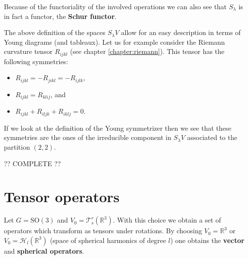     Because of the functoriality of the involved operations we can also see that $S_\lambda$ is in fact a functor, the \textbf{Schur functor}.

    \begin{example}
        The above definition of the spaces $S_\lambda V$ allow for an easy description in terms of Young diagrams (and tableaux). Let us for example consider the Riemann curvature tensor $R_{ijkl}$ (see chapter \ref{chapter:riemann}). This tensor has the following symmetries:
        \begin{itemize}
            \item $R_{ijkl} = -R_{jikl} = -R_{ijlk}$,
            \item $R_{ijkl} = R_{klij}$, and
            \item $R_{ijkl} + R_{iljk} + R_{iklj} = 0$.
        \end{itemize}
        If we look at the definition of the Young symmetrizer then we see that these symmetries are the ones of the irreducible component in $S_\lambda V$ associated to the partition $(2,2)$.

        ?? COMPLETE ??
    \end{example}

\section{Tensor operators}

    \begin{example}
        Let $G=\text{SO}(3)$ and $V_0=\mathcal{T}^r_s(\mathbb{R}^3)$. With this choice we obtain a set of operators which transform as tensors under rotations. By choosing $V_0=\mathbb{R}^3$ or $V_0=\mathcal{H}_l(\mathbb{R}^3)$ (space of spherical harmonics of degree $l$) one obtains the \textbf{vector} and \textbf{spherical operators}.
    \end{example}

